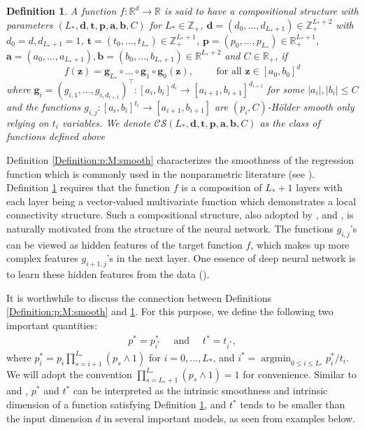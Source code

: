 \documentclass[11pt, preprint]{imsart}
\DeclareMathOperator*{\argmin}{argmin}
\numberwithin{equation}{section}
\def \mcCS{\mathcal{C}\mathcal{S}}
\def \bfg{\mathbf{g}}
\def \bfz{\mathbf{z}}
\def \bfd{\mathbf{d}}
\def \bft{\mathbf{t}}
\def \bfp{\mathbf{p}}
\def \bfa{\mathbf{a}}
\def \bfb{\mathbf{b}}
\def \bfa{\mathbf{a}}
\def \bfb{\mathbf{b}}
\def \bft{\mathbf{t}}
\theoremstyle{plain}
\newtheorem{Definition}{Definition}
\theoremstyle{definition}
\begin{document}
\begin{Definition}\label{Definition:Convolution:f0}
A function $f: \mathbb{R}^d \to \mathbb{R}$ is said to have a compositional structure with parameters $(L_*, \bfd, \bft, \bfp, \bfa, \bfb, C)$ for $L_*\in \mathbb{Z}_+$, $\bfd=(d_0, \ldots, d_{L_*+1})\in \mathbb{Z}_+^{L_*+2}$ with $d_0=d, d_{L_*+1}=1$, $\bft=(t_0,\ldots, t_{L_*})\in \mathbb{Z}_+^{L_*+1}$, $\bfp=(p_0,\ldots, p_{L_*})\in \mathbb{R}_+^{L_*+1}$, $\bfa=(a_0,\ldots, a_{L_*+1}), \bfb=(b_0,\ldots, b_{L_*+1})\in \mathbb{R}^{L_*+2}$ and $C\in \mathbb{R}_+$, if 
\begin{equation*}
	f(\bfz)=\bfg_{L_*}\circ\ldots\circ \bfg_1 \circ \bfg_0(\bfz),\quad\quad \textrm{ for all } \bfz\in [a_0, b_0]^d
\end{equation*}
where $\bfg_i=(g_{i,1},\ldots, g_{i,d_{i+1}})^\top: [a_i, b_i]^{d_i}\to [a_{i+1}, b_{i+1}]^{d_{i+1}}$ for some $|a_i|, |b_i|\leq C$ and the functions $g_{i,j}: [a_i, b_i]^{t_i} \to [a_{i+1}, b_{i+1}]$ are $(p_i, C)$-H\" older smooth only relying on $t_i$ variables. We denote $\mcCS(L_*, \bfd, \bft, \bfp,\bfa, \bfb, C)$ as the class of functions defined above
\end{Definition}
Definition \ref{Definition:p:M:smooth} characterizes the smoothness of the regression function which is commonly used in the nonparametric literature (see \citealp{gkkw06,h03}). 
Definition \ref{Definition:Convolution:f0} requires that the function $f$ is a composition of $L_*+1$ {layers} with each {layer} being a vector-valued multivariate function which demonstrates a local connectivity structure.  
Such a compositional structure, also adopted by \cite{bk19}, \cite{s19} and \cite{mk19}, 
is naturally motivated from the structure of the neural network. The functions $g_{i,j}$'s can be viewed as  hidden features of the target function $f$, which makes up more complex features $g_{i+1,j}$'s in the next layer. One essence of deep neural network is to learn these hidden features from the data (\citealp{zf14}).

It is worthwhile to discuss the connection between Definitions \ref{Definition:p:M:smooth} and \ref{Definition:Convolution:f0}. For this purpose, we define the following two important quantities:
\begin{eqnarray}
	p^*=p_{i^*}^*\quad \textrm{ and }\quad t^*=t_{i^*},\nonumber
\end{eqnarray}
where $p_i^*=p_i\prod_{s=i+1}^{L_*}(p_s\wedge 1)$ for $i=0,\ldots, L_*$,
and $i^*=\argmin_{0\leq i \leq L_*}p_i^*/t_i$.
We will adopt the convention $\prod_{s=L_*+1}^{L_*}(p_s\wedge 1)=1$ for convenience. Similar to \cite{bk19} and \cite{s19}, $p^*$ and $t^*$ can be interpreted as the intrinsic smoothness and intrinsic dimension of a function satisfying Definition \ref{Definition:Convolution:f0}, and $t^*$ tends to be  smaller than the input dimension $d$ in several important models, as seen from examples below. 
\end{document}
